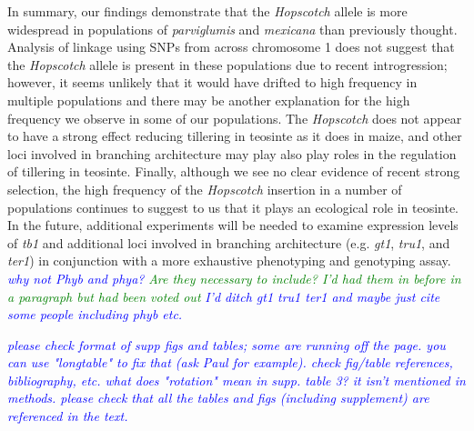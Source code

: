 \documentclass[11pt]{article}
\newcommand{\jri}[1]{\textcolor{blue}{ \emph{\scriptsize  #1}} }
\newcommand{\mbh}[1]{\textcolor{red}{ \emph{\scriptsize  #1}} }
\newcommand{\lev}[1]{\textcolor{green}{\emph{\scriptsize #1}} }
\begin{document}
\begin{linenumbers}
\begin{flushleft}
In summary, our findings demonstrate that the \emph{Hopscotch} allele is more widespread in populations of \emph{parviglumis} and \emph{mexicana} than previously thought. Analysis of linkage using SNPs from across chromosome 1 does not suggest that the \emph{Hopscotch} allele is present in these populations due to recent introgression; however, it seems unlikely that  it would have drifted to high frequency in multiple populations and there may be another explanation for the high frequency we observe in some of our populations. The \emph{Hopscotch} does not appear to have a strong effect reducing tillering in teosinte as it does in maize, and  other loci involved in branching architecture  may play also play roles in the regulation of tillering in teosinte. Finally, although we see no clear evidence of recent strong selection, the high frequency of the \emph{Hopscotch} insertion in a number of populations continues to suggest to us that it plays an ecological role in teosinte. In the future, additional experiments will be needed to examine expression levels of \emph{tb1} and additional loci involved in branching architecture (e.g. \emph{gt1}, \emph{tru1}, and \emph{ter1}) in conjunction with a more exhaustive phenotyping and genotyping assay. \jri{why not Phyb and phya? } \lev{Are they necessary to include? I'd had them in before in a paragraph but had been voted out} \jri{I'd ditch gt1 tru1 ter1 and maybe just cite some people including phyb etc.}

\jri{please check format of supp figs and tables; some are running off the page.  you can use "longtable" to fix that (ask Paul for example). check fig/table references, bibliography, etc. what does "rotation" mean in supp. table 3? it isn't mentioned in methods. please check that all the tables and figs (including supplement) are referenced in the text.}




\end{flushleft}
\end{linenumbers}
\end{document}
